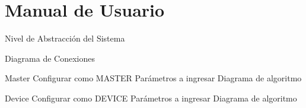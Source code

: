 
\chapter{Manual de Usuario} %

\label{AppendixA} %

Nivel de Abstracción del Sistema

Diagrama de Conexiones

Master
Configurar como MASTER
Parámetros a ingresar
Diagrama de algoritmo

Device
Configurar como DEVICE
Parámetros a ingresar
Diagrama de algoritmo




